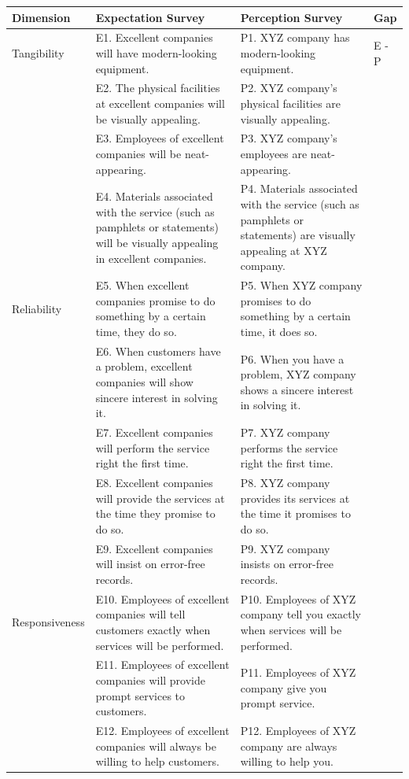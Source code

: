 \begin{table}[ht]
\centering
\begin{tabular}{p{2.5cm} p{6cm} p{6cm} p{1.5cm}}
\hline
\textbf{Dimension} & \textbf{Expectation Survey} & \textbf{Perception Survey} & \textbf{Gap} \\
\hline 
Tangibility & E1. Excellent companies will have modern-looking equipment. & P1. XYZ company has modern-looking equipment. & E - P \\
 & E2. The physical facilities at excellent companies will be visually appealing. & P2. XYZ company’s physical facilities are visually appealing. & \\
 & E3. Employees of excellent companies will be neat-appearing. & P3. XYZ company’s employees are neat-appearing. & \\
 & E4. Materials associated with the service (such as pamphlets or statements) will be visually appealing in excellent companies. & P4. Materials associated with the service (such as pamphlets or statements) are visually appealing at XYZ company. & \\
\hline
Reliability & E5. When excellent companies promise to do something by a certain time, they do so. & P5. When XYZ company promises to do something by a certain time, it does so. & \\
 & E6. When customers have a problem, excellent companies will show sincere interest in solving it. & P6. When you have a problem, XYZ company shows a sincere interest in solving it. & \\
 & E7. Excellent companies will perform the service right the first time. & P7. XYZ company performs the service right the first time. & \\
 & E8. Excellent companies will provide the services at the time they promise to do so. & P8. XYZ company provides its services at the time it promises to do so. & \\
 & E9. Excellent companies will insist on error-free records. & P9. XYZ company insists on error-free records. & \\
\hline
Responsiveness & E10. Employees of excellent companies will tell customers exactly when services will be performed. & P10. Employees of XYZ company tell you exactly when services will be performed. & \\
 & E11. Employees of excellent companies will provide prompt services to customers. & P11. Employees of XYZ company give you prompt service. & \\
 & E12. Employees of excellent companies will always be willing to help customers. & P12. Employees of XYZ company are always willing to help you. & \\

\end{tabular}
\end{table}
